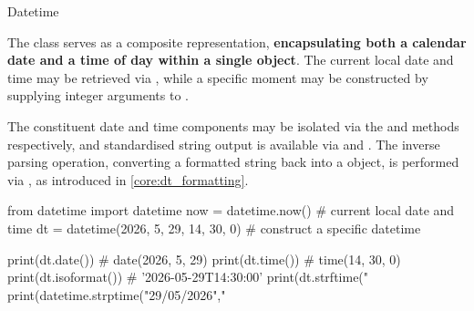 \documentclass[10pt]{article}
\begin{document}
    \begin{core}{Datetime}

      The  class serves as a composite representation, \textbf{encapsulating both a calendar date and a time of day within a single object}. The current local date and time may be retrieved via , while a specific moment may be constructed by supplying integer arguments to .

      The constituent date and time components may be isolated via the  and  methods respectively, and standardised string output is available via  and . The inverse parsing operation, converting a formatted string back into a  object, is performed via , as introduced in \autoref{core:dt_formatting}.

      \begin{pyconsole}

        from datetime import datetime
        now = datetime.now()                              # current local date and time
        dt = datetime(2026, 5, 29, 14, 30, 0)            # construct a specific datetime

        print(dt.date())                                  # date(2026, 5, 29)
        print(dt.time())                                  # time(14, 30, 0)
        print(dt.isoformat())                             # '2026-05-29T14:30:00'
        print(dt.strftime("%
        print(datetime.strptime("29/05/2026","%

      \end{pyconsole}

    \end{core}
\end{document}
